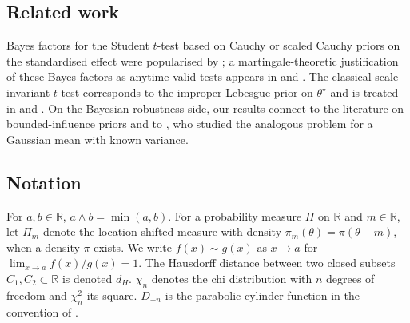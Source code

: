 \documentclass{article}%
\newcommand{\R}{\mathbb{R}}
\begin{document}

\subsection{Related work}

Bayes factors for the Student \(t\)-test based on Cauchy or scaled
Cauchy priors on the standardised effect were popularised by
\cite{Rouder2009}; a martingale-theoretic justification of these
Bayes factors as anytime-valid tests appears in
\cite{PerezOrtiz2024} and \cite[Sec.~4.5--4.6]{Wang2025}. The
classical scale-invariant \(t\)-test corresponds to the improper
Lebesgue prior on \(\theta^\star\) and is treated in
\cite[Theorem 2]{Lai1976} and \cite[Sec.~4.4]{Wang2025}.
On the Bayesian-robustness side, our results connect to the
literature on bounded-influence priors
\cite{Dawid1973,PericchiSmith1992,PericchiSanso1995,Berger1980} and to
\cite{Cortinovis2024,Cortinovis2025}, who studied the analogous
problem for a Gaussian mean with known variance.


\subsection{Notation}

For \(a,b\in\R\), \(a\wedge b=\min(a,b)\). For a probability measure
\(\Pi\) on \(\R\) and \(m\in\R\), let \(\Pi_m\) denote the
location-shifted measure with density \(\pi_m(\theta)=\pi(\theta-m)\),
when a density \(\pi\) exists. We write \(f(x)\sim g(x)\) as
\(x\to a\) for \(\lim_{x\to a} f(x)/g(x)=1\). The Hausdorff distance
between two closed subsets \(C_1,C_2\subset\R\) is denoted \(d_H\).
\(\chi_n\) denotes the chi distribution with \(n\) degrees of freedom
and \(\chi_n^2\) its square. \(D_{-n}\) is the parabolic cylinder
function in the convention of
\cite[Eq.~9.241]{GradshteynRyzhik2014}.
\end{document}
